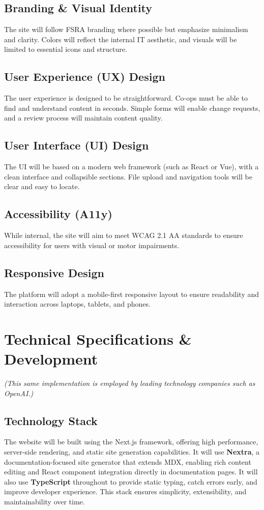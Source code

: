 \documentclass[11pt,a4paper]{article}
\begin{document}
\subsection{Branding \& Visual Identity}
The site will follow FSRA branding where possible but emphasize minimalism and clarity. Colors will reflect the internal IT aesthetic, and visuals will be limited to essential icons and structure.

\subsection{User Experience (UX) Design}
The user experience is designed to be straightforward. Co-ops must be able to find and understand content in seconds. Simple forms will enable change requests, and a review process will maintain content quality.

\subsection{User Interface (UI) Design}
The UI will be based on a modern web framework (such as React or Vue), with a clean interface and collapsible sections. File upload and navigation tools will be clear and easy to locate.

\subsection{Accessibility (A11y)}
While internal, the site will aim to meet WCAG 2.1 AA standards to ensure accessibility for users with visual or motor impairments.

\subsection{Responsive Design}
The platform will adopt a mobile-first responsive layout to ensure readability and interaction across laptops, tablets, and phones.

\section{Technical Specifications \& Development}
  \textit{(This same implementation is employed by leading technology companies such as OpenAI.)}

  \subsection{Technology Stack}
    The website will be built using the Next.js framework, offering high performance, server-side rendering, and static site generation capabilities. It will use \textbf{Nextra}, a documentation-focused site generator that extends MDX, enabling rich content editing and React component integration directly in documentation pages. It will also use \textbf{TypeScript} throughout to provide static typing, catch errors early, and improve developer experience. This stack ensures simplicity, extensibility, and maintainability over time.
\end{document}

